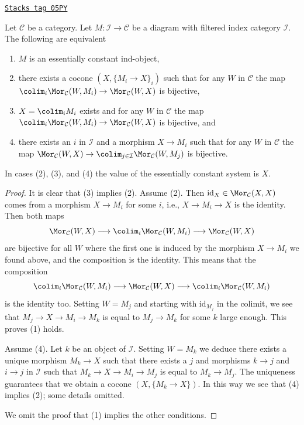 \begin{lemma}
\label{categories-lemma-characterize-essentially-constant-ind}
\href{https://stacks.math.columbia.edu/tag/05PY}{\texttt{Stacks tag 05PY}}

Let $\mathcal{C}$ be a category. Let $M : \mathcal{I} \to \mathcal{C}$
be a diagram with filtered index category $\mathcal{I}$.
The following are equivalent
\begin{enumerate}
\item $M$ is an essentially constant ind-object,
\item there exists a cocone $(X, \{M_i \to X\}_i)$ such that for any
$W$ in $\mathcal{C}$ the map
$\colim_i \Mor_\mathcal{C}(W, M_i) \to \Mor_\mathcal{C}(W, X)$
is bijective,
\item $X = \colim_i M_i$ exists and for any $W$ in $\mathcal{C}$
the map
$\colim_i \Mor_\mathcal{C}(W, M_i) \to \Mor_\mathcal{C}(W, X)$
is bijective, and
\item there exists an $i$ in $\mathcal{I}$ and a morphism $X \to M_i$
such that for any $W$ in $\mathcal{C}$ the map $\Mor_\mathcal{C}(W, X) \to
\colim_{j \in \mathcal{I}} \Mor_\mathcal{C}(W, M_j)$
is bijective.
\end{enumerate}
In cases (2), (3), and (4) the value of the essentially constant system is $X$.
\end{lemma}

\begin{proof}
It is clear that (3) implies (2). Assume (2).
Then $\text{id}_X \in \Mor_\mathcal{C}(X, X)$
comes from a morphism $X \to M_i$ for some $i$, i.e., $X \to M_i \to X$
is the identity. Then both maps
$$
\Mor_\mathcal{C}(W, X)
\longrightarrow
\colim_i \Mor_\mathcal{C}(W, M_i)
\longrightarrow
\Mor_\mathcal{C}(W, X)
$$
are bijective for all $W$ where the first one is induced by the morphism
$X \to M_i$ we found above, and the composition is the identity. This means
that the composition
$$
\colim_i \Mor_\mathcal{C}(W, M_i)
\longrightarrow
\Mor_\mathcal{C}(W, X)
\longrightarrow
\colim_i \Mor_\mathcal{C}(W, M_i)
$$
is the identity too. Setting $W = M_j$ and starting with $\text{id}_{M_j}$
in the colimit, we see that $M_j \to X \to M_i \to M_k$ is equal to
$M_j \to M_k$ for some $k$ large enough. This proves (1) holds.

\medskip\noindent
Assume (4). Let $k$ be an object of $\mathcal{I}$. Setting $W = M_k$
we deduce there exists a unique morphism $M_k \to X$ such that
there exists a $j$ and morphisms $k \to j$ and
$i \to j$ in $\mathcal{I}$ such that $M_k \to X \to M_i \to M_j$
is equal to $M_k \to M_j$. The uniqueness guarantees that we obtain a
cocone $(X, \{M_k \to X\})$. In this way we see that (4) implies (2);
some details omitted.

\medskip\noindent
We omit the proof that (1) implies the other conditions.
\end{proof}

